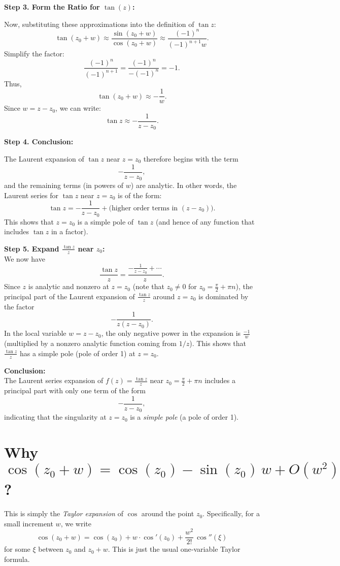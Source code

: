 \documentclass[12pt]{article}
\theoremstyle{definition} %
\theoremstyle{plain} %
\begin{document}
\medskip
\textbf{Step 3. Form the Ratio for \(\tan(z)\):}

Now, substituting these approximations into the definition of \(\tan z\):
\[
\tan(z_0+w) \approx \frac{\sin(z_0+w)}{\cos(z_0+w)} \approx \frac{(-1)^n}{(-1)^{n+1}w}.
\]
Simplify the factor:
\[
\frac{(-1)^n}{(-1)^{n+1}} = \frac{(-1)^n}{-(-1)^n} = -1.
\]
Thus,
\[
\tan(z_0+w) \approx -\frac{1}{w}.
\]
Since \(w=z-z_0\), we can write:
\[
\tan z \approx -\frac{1}{z-z_0}.
\]

\medskip
\textbf{Step 4. Conclusion:}

The Laurent expansion of \(\tan z\) near \(z=z_0\) therefore begins with the term
\[
-\frac{1}{z-z_0},
\]
and the remaining terms (in powers of \(w\)) are analytic. In other words, the Laurent series for \(\tan z\) near \(z=z_0\) is of the form:
\[
\tan z = -\frac{1}{z-z_0} + \text{(higher order terms in } (z-z_0) \text{)}.
\]
This shows that \(z=z_0\) is a simple pole of \(\tan z\) (and hence of any function that includes \(\tan z\) in a factor).


\bigskip

\textbf{Step 5. Expand \(\frac{\tan z}{z}\) near \(z_0\):}\\[1mm]
We now have
\[
\frac{\tan z}{z} = \frac{-\frac{1}{z-z_0} + \cdots}{z}.
\]
Since \(z\) is analytic and nonzero at \(z=z_0\) (note that \(z_0\neq 0\) for \(z_0=\frac{\pi}{2}+\pi n\)), the principal part of the Laurent expansion of \(\frac{\tan z}{z}\) around \(z=z_0\) is dominated by the factor
\[
-\frac{1}{z(z-z_0)}.
\]
In the local variable \(w=z-z_0\), the only negative power in the expansion is \(\frac{-1}{w}\) (multiplied by a nonzero analytic function coming from \(1/z\)). This shows that \(\frac{\tan z}{z}\) has a simple pole (pole of order 1) at \(z=z_0\).

\bigskip

\textbf{Conclusion:}\\[1mm]
The Laurent series expansion of \(f(z)=\frac{\tan z}{z}\) near \(z_0=\frac{\pi}{2}+\pi n\) includes a principal part with only one term of the form
\[
-\frac{1}{z-z_0},
\]
indicating that the singularity at \(z=z_0\) is a \emph{simple pole} (a pole of order 1).
\section*{Why \(\cos(z_0 + w) = \cos(z_0) - \sin(z_0)\,w + O(w^2)\)?}

This is simply the \emph{Taylor expansion} of \(\cos\) around the point \(z_0\). Specifically, for a small increment \(w\), we write
\[
\cos(z_0 + w) = \cos(z_0) + w \cdot \cos'(z_0) + \frac{w^2}{2!}\,\cos''(\xi)
\]
for some \(\xi\) between \(z_0\) and \(z_0+w\). This is just the usual one‐variable Taylor formula.
\end{document}
